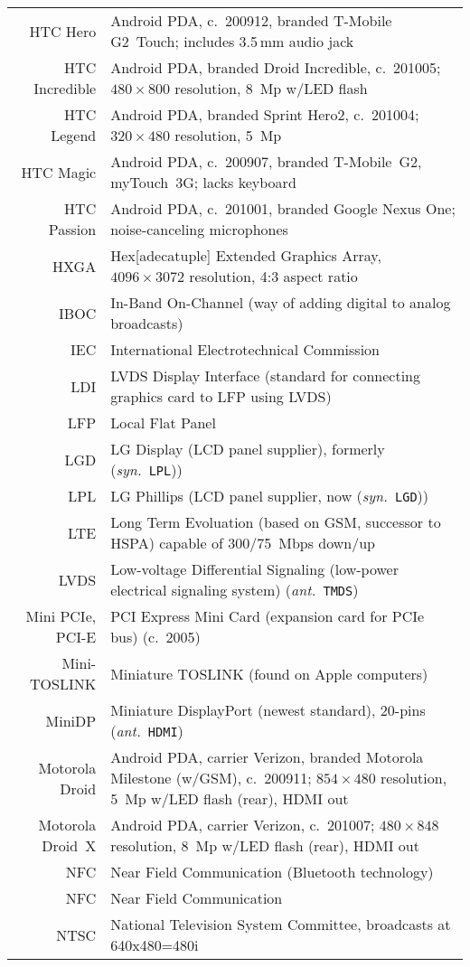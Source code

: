 \documentclass[12pt,twoside]{article}
\newcommand{\ant}[1]{(\textit{ant.}~\texttt{#1})}
\newcommand{\syn}[1]{(\textit{syn.}~\texttt{#1})}
\begin{document}
\begin{longtable}[>{\bfseries}l]{>{\ttfamily}r l}
HTC Hero & Android PDA, c.~200912, branded T-Mobile G2~Touch; includes 3.5\,mm audio jack \\
HTC Incredible & Android PDA, branded Droid Incredible, c.~201005; $480 \times 800$ resolution, 8~Mp w/LED flash \\
HTC Legend & Android PDA, branded Sprint Hero2, c.~201004; $320 \times 480$ resolution, 5~Mp \\
HTC Magic & Android PDA, c.~200907, branded T-Mobile~G2, myTouch~3G; lacks keyboard \\
HTC Passion & Android PDA, c.~201001, branded Google Nexus One; noise-canceling microphones \\
HXGA & Hex[adecatuple] Extended Graphics Array, $4096 \times 3072$ resolution, 4:3 aspect ratio \\
IBOC & In-Band On-Channel (way of adding digital to analog broadcasts) \\
IEC & International Electrotechnical Commission \\
LDI & LVDS Display Interface (standard for connecting graphics card to LFP using LVDS) \\
LFP & Local Flat Panel \\
LGD & LG Display (LCD panel supplier), formerly \syn{LPL}) \\
LPL & LG Phillips (LCD panel supplier, now \syn{LGD}) \\
LTE & Long Term Evoluation (based on GSM, successor to HSPA) capable of 300/75~Mbps down/up \\
LVDS & Low-voltage Differential Signaling (low-power electrical signaling system) \ant{TMDS} \\
Mini PCIe, PCI-E & PCI Express Mini Card (expansion card for PCIe bus) (c.~2005) \\
Mini-TOSLINK & Miniature TOSLINK (found on Apple computers) \\
MiniDP & Miniature DisplayPort (newest standard), 20-pins \ant{HDMI} \\
Motorola Droid & Android PDA, carrier Verizon, branded Motorola Milestone (w/GSM), c.~200911; $854 \times 480$ resolution, 5~Mp w/LED flash (rear), HDMI out \\
Motorola Droid~X & Android PDA, carrier Verizon, c.~201007; $480 \times 848$ resolution, 8~Mp w/LED flash (rear), HDMI out \\
NFC & Near Field Communication (Bluetooth technology) \\
NFC & Near Field Communication \\
NTSC & National Television System Committee, broadcasts at 640x480=480i \\

\end{longtable}
\end{document}
